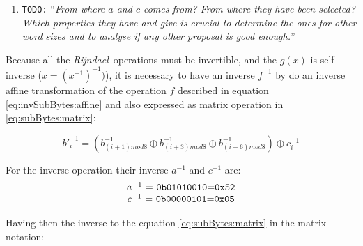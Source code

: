 \documentclass[10pt,a4paper,twoside]{llncs}
\newcommand{\todo}[1]{\texttt{\color{red}TODO:} ``\emph{#1}''}
\newcommand{\rijndael}{\emph{Rijndael}}
\begin{document}
\begin{enumerate}
 \item \todo{From where $a$ and $c$ comes from? From where they have been selected? Which properties they have and give is crucial to determine the ones for other word sizes and to analyse if any other proposal is good enough.}
\end{enumerate}

Because all the \rijndael\, operations must be invertible, and the $g(x)$ is self-inverse ($x=(x^{-1})^{-1})$), it is necessary to have an inverse $f^{-1}$ by do an inverse affine transformation of the operation $f$ described in equation \ref{eq:invSubBytes:affine} and also expressed as matrix operation in \ref{eq:subBytes:matrix}:

\begin{equation}\label{eq:invSubBytes:affine}
 b'^{-1}_{i} = (b^{-1}_{(i+1)mod8} \oplus b^{-1}_{(i+3)mod8} \oplus 
          b^{-1}_{(i+6)mod8}) \oplus c^{-1}_{i}
\end{equation}

For the inverse operation their inverse $a^{-1}$ and $c^{-1}$ are:
\begin{equation}
 \begin{tabular}{c}
  $a^{-1}$ = \texttt{0b01010010}=\texttt{0x52}\\
  $c^{-1}$ = \texttt{0b00000101}=\texttt{0x05}
 \end{tabular}
\end{equation}

Having then the inverse to the equation \ref{eq:subBytes:matrix} in the matrix notation:
\end{document}
